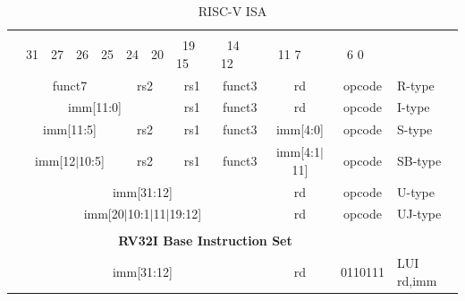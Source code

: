 \documentclass[11pt]{article}
\newcommand{\instbit}[1]{\mbox{\scriptsize #1}}
\newcommand{\instbitrange}[2]{~\instbit{#1} \hfill \instbit{#2}~}
\begin{document}
{\begin{table}[H]
\begin{small}
\begin{center}
\caption{RISC-V ISA}
\label{tab:ISA}
\begin{tabular}{p{0in}p{0.4in}p{0.05in}p{0.05in}p{0.05in}p{0.05in}p{0.4in}p{0.6in}p{0.4in}p{0.6in}p{0.7in}l}
& & & & & & & & & & \\
                      &
\multicolumn{1}{l}{\instbit{31}} &
\multicolumn{1}{r}{\instbit{27}} &
\instbit{26} &
\instbit{25} &
\multicolumn{1}{l}{\instbit{24}} &
\multicolumn{1}{r}{\instbit{20}} &
\instbitrange{19}{15} &
\instbitrange{14}{12} &
\instbitrange{11}{7} &
\instbitrange{6}{0} \\
\cline{2-11}


&
\multicolumn{4}{|c|}{funct7} &
\multicolumn{2}{c|}{rs2} &
\multicolumn{1}{c|}{rs1} &
\multicolumn{1}{c|}{funct3} &
\multicolumn{1}{c|}{rd} &
\multicolumn{1}{c|}{opcode} & R-type \\
\cline{2-11}


&
\multicolumn{6}{|c|}{imm[11:0]} &
\multicolumn{1}{c|}{rs1} &
\multicolumn{1}{c|}{funct3} &
\multicolumn{1}{c|}{rd} &
\multicolumn{1}{c|}{opcode} & I-type \\
\cline{2-11}


&
\multicolumn{4}{|c|}{imm[11:5]} &
\multicolumn{2}{c|}{rs2} &
\multicolumn{1}{c|}{rs1} &
\multicolumn{1}{c|}{funct3} &
\multicolumn{1}{c|}{imm[4:0]} &
\multicolumn{1}{c|}{opcode} & S-type \\
\cline{2-11}


&
\multicolumn{4}{|c|}{imm[12$\vert$10:5]} &
\multicolumn{2}{c|}{rs2} &
\multicolumn{1}{c|}{rs1} &
\multicolumn{1}{c|}{funct3} &
\multicolumn{1}{c|}{imm[4:1$\vert$11]} &
\multicolumn{1}{c|}{opcode} & SB-type \\
\cline{2-11}


&
\multicolumn{8}{|c|}{imm[31:12]} &
\multicolumn{1}{c|}{rd} &
\multicolumn{1}{c|}{opcode} & U-type \\
\cline{2-11}


&
\multicolumn{8}{|c|}{imm[20$\vert$10:1$\vert$11$\vert$19:12]} &
\multicolumn{1}{c|}{rd} &
\multicolumn{1}{c|}{opcode} & UJ-type \\
\cline{2-11}


&
\multicolumn{10}{c}{} & \\
&
\multicolumn{10}{c}{\bf RV32I Base Instruction Set} & \\
\cline{2-11}


&
\multicolumn{8}{|c|}{imm[31:12]} &
\multicolumn{1}{c|}{rd} &
\multicolumn{1}{c|}{0110111} & LUI rd,imm \\
\cline{2-11}



\end{tabular}
\end{center}
\end{small}
\end{table}}
\end{document}
